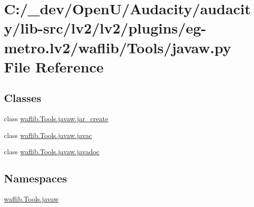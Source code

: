 \hypertarget{lv2_2plugins_2eg-metro_8lv2_2waflib_2_tools_2javaw_8py}{}\section{C\+:/\+\_\+dev/\+Open\+U/\+Audacity/audacity/lib-\/src/lv2/lv2/plugins/eg-\/metro.lv2/waflib/\+Tools/javaw.py File Reference}
\label{lv2_2plugins_2eg-metro_8lv2_2waflib_2_tools_2javaw_8py}
\subsection*{Classes}
\begin{DoxyCompactItemize}
\item 
class \hyperlink{classwaflib_1_1_tools_1_1javaw_1_1jar__create}{waflib.\+Tools.\+javaw.\+jar\+\_\+create}
\item 
class \hyperlink{classwaflib_1_1_tools_1_1javaw_1_1javac}{waflib.\+Tools.\+javaw.\+javac}
\item 
class \hyperlink{classwaflib_1_1_tools_1_1javaw_1_1javadoc}{waflib.\+Tools.\+javaw.\+javadoc}
\end{DoxyCompactItemize}
\subsection*{Namespaces}
\begin{DoxyCompactItemize}
\item 
 \hyperlink{namespacewaflib_1_1_tools_1_1javaw}{waflib.\+Tools.\+javaw}
\end{DoxyCompactItemize}
